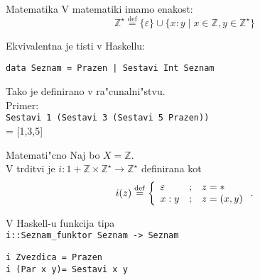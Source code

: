 \documentclass[t,usenames,dvipsnames]{beamer} %
\newcommand{\Z}{\mathbb Z}
\begin{document}
\begin{frame}
	\begin{block}{Matematika}
		V matematiki imamo enakost:
		$$\Z^\star  \stackrel{\mathrm{def}}{=} \{\varepsilon\} \cup \{ x:y \mid x \in \Z,  y \in \Z^\star   \}$$
	\end{block}
	Ekvivalentna je tisti v Haskellu:
	\begin{beamerboxesrounded}[lower=loweryel,shadow=false]{}
	\texttt{data Seznam = Prazen | Sestavi Int Seznam}
	\end{beamerboxesrounded}
	Tako je definirano v ra"cunalni"stvu.
	\\
	Primer: \\
	\texttt{Sestavi 1 (Sestavi 3 (Sestavi 5 Prazen))} \\
	 = [1,3,5]

\end{frame}

\begin{frame}
	\begin{block}{Matemati"cno}	
		Naj bo $X = \Z$. \\
		V trditvi je $i: 1\!+\!\Z\! \times\! \Z^\star \to \Z^\star$ definirana kot
		$$ \mathnormal{i}(z) \stackrel{\mathrm{def}}{=} \left\{ \begin{array}{lll}
		\varepsilon & ; & z = * \\
		x : y & ; & z = (x,y)
		\end{array} \right. . $$ 
	\end{block}
	
	V Haskell-u funkcija tipa \\
	\texttt{i::Seznam\_funktor Seznam -> Seznam} \\	
	\begin{beamerboxesrounded}[lower=loweryel,shadow=false]{}
		\texttt{i Zvezdica = Prazen} \\
		\texttt{i (Par x y)= Sestavi x y}
	\end{beamerboxesrounded}
		
\end{frame}
\end{document}
